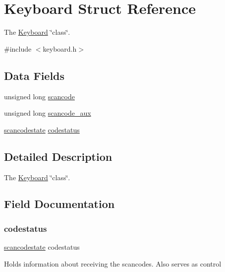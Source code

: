 \hypertarget{struct_keyboard}{}\section{Keyboard Struct Reference}
\label{struct_keyboard}


The \hyperlink{struct_keyboard}{Keyboard} \char`\"{}class\char`\"{}.  




{\ttfamily \#include $<$keyboard.\+h$>$}

\subsection*{Data Fields}
\begin{DoxyCompactItemize}
\item 
unsigned long \hyperlink{struct_keyboard_a28472595f3d5303df45323230e37fc99}{scancode}
\item 
unsigned long \hyperlink{struct_keyboard_a47f04d0965fb400bb993629770de3f23}{scancode\+\_\+aux}
\item 
\hyperlink{group__keyboard_ga0b76c3eaf709ef57eecc834107a6d8cb}{scancodestate} \hyperlink{struct_keyboard_ae95dd0de5cee7e3f7148364eb9fa7b5b}{codestatus}
\end{DoxyCompactItemize}


\subsection{Detailed Description}
The \hyperlink{struct_keyboard}{Keyboard} \char`\"{}class\char`\"{}. 

\subsection{Field Documentation}
\hypertarget{struct_keyboard_ae95dd0de5cee7e3f7148364eb9fa7b5b}{}\label{struct_keyboard_ae95dd0de5cee7e3f7148364eb9fa7b5b} 
\subsubsection{\texorpdfstring{codestatus}{codestatus}}
{\footnotesize\ttfamily \hyperlink{group__keyboard_ga0b76c3eaf709ef57eecc834107a6d8cb}{scancodestate} codestatus}

Holds information about receiving the scancodes. Also serves as control \hypertarget{struct_keyboard_a28472595f3d5303df45323230e37fc99}{}\label{struct_keyboard_a28472595f3d5303df45323230e37fc99} 
